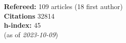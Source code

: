 \textbf{Refereed:} 109 articles (18 first author)\\\textbf{Citations} 32814\\\textbf{h-index:} 45\\(as of \textit{2023-10-09})
